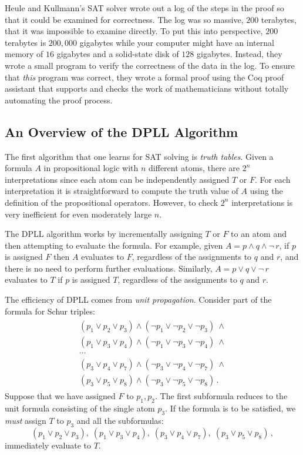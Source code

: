 Heule and Kullmann's SAT solver wrote out a log of the steps in the proof so that it could be examined for correctness. The log was so massive, $200$ terabytes, that it was impossible to examine directly. To put this into perspective, $200$ terabytes is $200,\!000$ gigabytes while your computer might have an internal memory of $16$ gigabytes and a solid-state disk of $128$ gigabytes. Instead, they wrote a small program to verify the correctness of the data in the log. To ensure that \emph{this} program was correct, they wrote a formal proof using the Coq proof assistant that supports and checks the work of mathematicians without totally automating the proof process.

\subsection{An Overview of the DPLL Algorithm}

The first algorithm that one learns for SAT solving is \emph{truth tables}. Given a formula $A$ in propositional logic with $n$ different atoms, there are $2^n$ interpretations since each atom can be independently assigned $T$ or $F$. For each interpretation it is straightforward to compute the truth value of $A$ using the definition of the propositional operators. However, to check $2^n$ interpretations is very inefficient for even moderately large $n$.

The DPLL algorithm works by incrementally assigning $T$ or $F$ to an atom and then attempting to evaluate the formula. For example, given $A=p \wedge q \wedge \neg\, r$, if $p$ is assigned $F$ then $A$ evaluates to $F$, regardless of the assignments to $q$ and $r$, and there is no need to perform further evaluations. Similarly, $A=p\vee q \vee \neg\, r$ evaluates to $T$ if $p$ is assigned $T$, regardless of the assignments to $q$ and $r$.

The efficiency of DPLL comes from \emph{unit propagation}. Consider part of the formula for Schur triples:
\begin{align}
\begin{array}{l}\label{eq.schur3}
(p_1 \vee p_2 \vee p_3) \wedge (\neg p_1 \vee \neg p_2 \vee \neg p_3) \:\wedge \\
(p_1 \vee p_3 \vee p_4) \wedge (\neg p_1 \vee \neg p_3 \vee \neg p_4) \:\wedge \\
\cdots\\
(p_3 \vee p_4 \vee p_7) \wedge (\neg p_3 \vee \neg p_4 \vee \neg p_7) \:\wedge \\
(p_3 \vee p_5 \vee p_8) \wedge (\neg p_3 \vee \neg p_5 \vee \neg p_8)\,.
\end{array}
\end{align}
Suppose that we have assigned $F$ to $p_1,p_2$. The first subformula reduces to the unit formula consisting of the single atom $p_3$. If the formula is to be satisfied, we \emph{must} assign $T$ to $p_3$ and all the subformulas:
\[
(p_1 \vee p_2 \vee p_3),\;(p_1 \vee p_3 \vee p_4),\;
(p_3 \vee p_4 \vee p_7),\;(p_3 \vee p_5 \vee p_8)\,,
\]
immediately evaluate to $T$.

